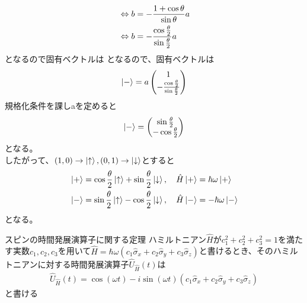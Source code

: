\documentclass{jsarticle}  %
\numberwithin{equation}{section} %
\numberwithin{figure}{section}
\begin{document}
\begin{proofline}
\begin{align}
            &\Leftrightarrow b = -\frac{1 + \cos \theta}{\sin \theta} a \notag \\
            &\Leftrightarrow b = -\frac{\cos \frac{\theta}{2}}{\sin \frac{\theta}{2}}a
        \end{align}
        となるので固有ベクトルは
        となるので、固有ベクトルは
        \begin{align}
            \ket{-} = a 
            \left(
            \begin{matrix}
                1\\
                -\frac{\cos \frac{\theta}{2}}{\sin \frac{\theta}{2}}
            \end{matrix}
            \right)
        \end{align}
        規格化条件を課しaを定めると
        \begin{align}
            \ket{-} = 
            \left(
            \begin{matrix}
                \sin \frac{\theta}{2}\\
                -\cos \frac{\theta}{2}
            \end{matrix}
            \right)
        \end{align}
        となる。\\
        したがって、$(1,0)\rightarrow \ket{\uparrow},(0,1)\rightarrow \ket{\downarrow}$とすると
        \begin{align}
            &\ket{+} = \cos \frac{\theta}{2} \ket{\uparrow} + \sin \frac{\theta}{2} \ket{\downarrow},\quad \hat{H}\ket{+} = \hbar \omega \ket{+} \\
            &\ket{-} = \sin \frac{\theta}{2} \ket{\uparrow} - \cos \frac{\theta}{2} \ket{\downarrow},\quad \hat{H}\ket{-} = -\hbar \omega \ket{-} 
        \end{align}
        となる。
    \end{proofline}
    \begin{itembox}[l]{\large{スピンの時間発展演算子に関する定理}}
        ハミルトニアン$\hat{H}$が$c_1^2 + c_2^2 + c_3^2=1$を満たす実数$c_1,c_2,c_3$を用いて$\hat{H}=\hbar \omega(c_1 \hat{\sigma}_x + c_2\hat{\sigma}_y + c_3\hat{\sigma}_z)$と書けるとき、そのハミルトニアンに対する時間発展演算子$\hat{U}_{\hat{H}}(t)$は
        \begin{align}
            \hat{U}_{\hat{H}}(t) = \cos (\omega t) - i\sin (\omega t) \left( c_1 \hat{\sigma}_x + c_2 \hat{\sigma}_y + c_3 \hat{\sigma}_z \right)
        \end{align}
        と書ける
    \end{itembox}
\end{document}
